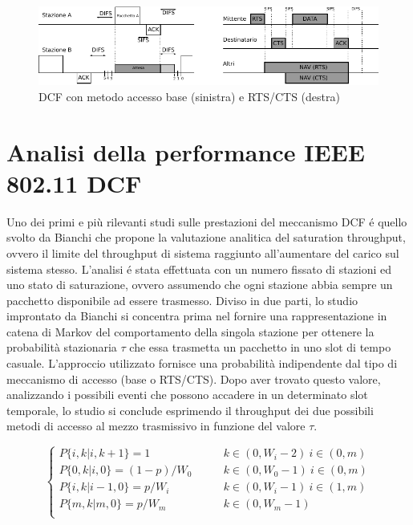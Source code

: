 \begin{figure}[!htb]
	\centering
	\includegraphics{images/img1.pdf}
	\caption{DCF con metodo accesso base (sinistra) e RTS/CTS (destra)}
	\label{fig:dcfex}
\end{figure}

\section{Analisi della performance IEEE 802.11 DCF}
Uno dei primi e pi\`u rilevanti studi sulle prestazioni del meccanismo DCF \'e quello svolto da Bianchi \cite{bianchi2000performance} che propone la valutazione analitica del saturation throughput, ovvero il limite del throughput di sistema raggiunto all'aumentare del carico sul sistema stesso.
L'analisi \'e stata effettuata con un numero fissato di stazioni ed uno stato di saturazione, ovvero assumendo che ogni stazione abbia sempre un pacchetto disponibile ad essere trasmesso.
Diviso in due parti, lo studio improntato da Bianchi si concentra prima nel fornire una rappresentazione in catena di Markov del comportamento della singola stazione per ottenere la probabilit\`a stazionaria $\tau$ che essa trasmetta un pacchetto in uno slot di tempo casuale.
L'approccio utilizzato fornisce una probabilit\`a indipendente dal tipo di meccanismo di accesso (base o RTS/CTS).
Dopo aver trovato questo valore, analizzando i possibili eventi che possono accadere in un determinato slot temporale, lo studio si conclude esprimendo il throughput dei due possibili metodi di accesso al mezzo trasmissivo in funzione del valore $\tau$.

$$
\begin{cases}
  P \{ i, k| i, k + 1\}  =1 	 &\qquad k \in (0, W_{i}-2) \ i \in (0,m) \\ 
  P \{ 0, k| i, 0\}  =(1-p)/W_{0} 	 &\qquad k \in (0, W_{0}-1) \ i \in (0,m) \\ 
  P \{ i, k| i-1, 0\}  =p/W_{i} 	 &\qquad k \in (0, W_{i}-1) \ i \in (1,m) \\ 
  P \{ m, k| m, 0\}  =p/W_{m} 	 &\qquad k \in (0, W_{m}-1) \\
\end{cases}
$$

